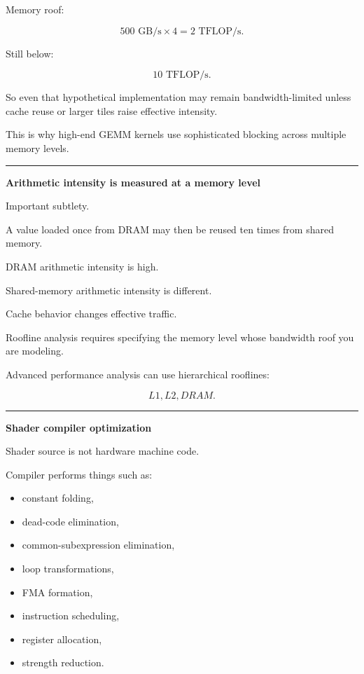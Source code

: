 Memory roof:

\[
500\text{ GB/s}
\times
4
=
2\text{ TFLOP/s}.
\]

Still below:

\[
10\text{ TFLOP/s}.
\]

So even that hypothetical implementation may remain bandwidth-limited unless cache reuse or larger tiles raise effective intensity.

This is why high-end GEMM kernels use sophisticated blocking across multiple memory levels.

\begin{center}\rule{0.5\linewidth}{0.5pt}\end{center}

\textbf{Arithmetic intensity is measured at a memory level}

Important subtlety.

A value loaded once from DRAM may then be reused ten times from shared memory.

DRAM arithmetic intensity is high.

Shared-memory arithmetic intensity is different.

Cache behavior changes effective traffic.

Roofline analysis requires specifying the memory level whose bandwidth roof you are modeling.

Advanced performance analysis can use hierarchical rooflines:

\[
L1,
L2,
DRAM.
\]

\begin{center}\rule{0.5\linewidth}{0.5pt}\end{center}

\textbf{Shader compiler optimization}

Shader source is not hardware machine code.

Compiler performs things such as:

\begin{itemize}
\tightlist
\item
  constant folding,
\item
  dead-code elimination,
\item
  common-subexpression elimination,
\item
  loop transformations,
\item
  FMA formation,
\item
  instruction scheduling,
\item
  register allocation,
\item
  strength reduction.
\end{itemize}

